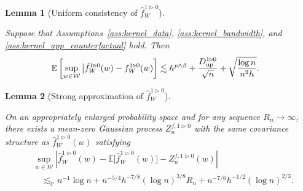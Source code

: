 \documentclass[11pt,lof]{puthesis}
\renewcommand{\P}{\ensuremath{\mathbb{P}}}
\newcommand{\E}{\ensuremath{\mathbb{E}}}
\newcommand{\cW}{\ensuremath{\mathcal{W}}}
\newcommand{\Du}{\ensuremath{D_{\textup{up}}}}
\theoremstyle{break}
\newtheorem{lemma}{Lemma}[section]
\theoremstyle{proof}
\begin{document}
\begin{lemma}[Uniform consistency of $\hat f_W^{1 \triangleright 0}$]
  \label{lem:kernel_app_counterfactual_uniform_consistency}

  Suppose that Assumptions~\ref{ass:kernel_data},
  \ref{ass:kernel_bandwidth}, and \ref{ass:kernel_app_counterfactual} hold.
  Then
  \begin{align*}
    \E\left[
      \sup_{w \in \cW}
      \big|\hat f_W^{1 \triangleright 0}(w)
      - f_W^{1 \triangleright 0}(w)
    \right]
    &\lesssim
    h^{p \wedge \beta}
    + \frac{\Du^{1 \triangleright 0}}{\sqrt n}
    + \sqrt{\frac{\log n}{n^2h}}.
  \end{align*}

\end{lemma}

\begin{lemma}[Strong approximation of $\hat f_W^{1 \triangleright 0}$]
  \label{lem:kernel_app_counterfactual_sa}

  On an appropriately enlarged probability space
  and for any sequence $R_n \to \infty$,
  there exists a mean-zero Gaussian process
  $Z_n^{f, 1 \triangleright 0}$
  with the same covariance structure as
  $\hat f_W^{1 \triangleright 0}(w)$ satisfying
  \begin{align*}
    &\sup_{w \in \cW}
    \left|
    \hat f_W^{1 \triangleright 0}(w)
    - \E\big[\hat f_W^{1 \triangleright 0}(w)\big]
    - Z_n^{f, 1 \triangleright 0}(w)
    \right| \\
    &\quad\lesssim_\P
    n^{-1} \log n
    + n^{-5/4} h^{-7/8} (\log n)^{3/8} R_n
    + n^{-7/6} h^{-1/2} (\log n)^{2/3}.
  \end{align*}

\end{lemma}
\end{document}
